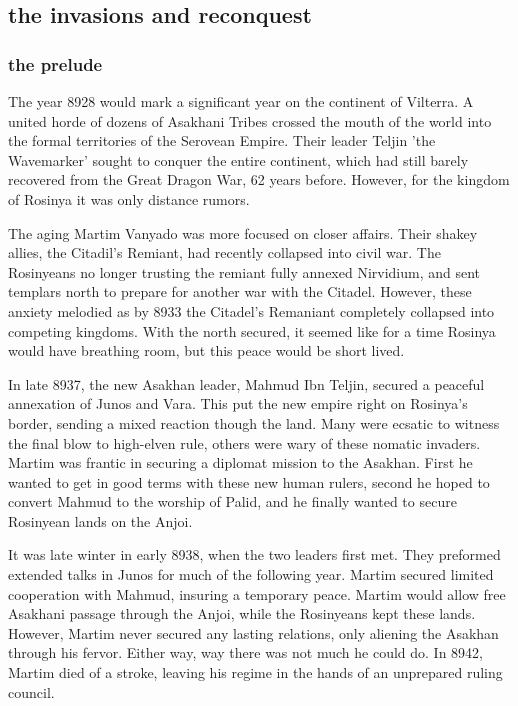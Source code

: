 \documentclass[../main.tex]{subfiles}
\begin{document}


% 

\subsection{the invasions and reconquest}

\subsubsection{the prelude}
The year 8928 would mark a significant year on the continent of Vilterra. A united horde of dozens of Asakhani Tribes crossed
the mouth of the world into the formal territories of the Serovean Empire. Their leader Teljin 'the Wavemarker' sought to 
conquer the entire continent, which had still barely recovered from the Great Dragon War, 62 years before. However, for the 
kingdom of Rosinya it was only distance rumors. 

The aging Martim Vanyado was more focused on closer affairs. Their shakey allies, the Citadil's Remiant, had recently collapsed into civil war.
The Rosinyeans no longer trusting the remiant fully annexed Nirvidium, and sent templars north to prepare for another war with the Citadel. 
However, these anxiety melodied as by 8933 the Citadel's Remaniant completely collapsed into competing kingdoms. With the north
secured, it seemed like for a time Rosinya would have breathing room, but this peace would be short lived. 

In late 8937, the new Asakhan leader, Mahmud Ibn Teljin, secured a peaceful annexation of Junos and Vara. This put the
new empire right on Rosinya's border, sending a mixed reaction though the land. Many were ecsatic to witness the final
blow to high-elven rule, others were wary of these nomatic invaders. Martim was frantic in securing a diplomat mission to
the Asakhan. First he wanted to get in good terms with these new human rulers, second he hoped to convert Mahmud to 
the worship of Palid, and he finally wanted to secure Rosinyean lands on the Anjoi. 

It was late winter in early 8938, when the two leaders first met. They preformed extended talks in Junos for
much of the following year. Martim secured limited cooperation with Mahmud, insuring a temporary peace. 
Martim would allow free Asakhani passage through the Anjoi, while the Rosinyeans kept these lands. However,
Martim never secured any lasting relations, only aliening the Asakhan through his fervor. Either way,
way there was not much he could do. In 8942, Martim died of a stroke, leaving his regime in the hands of an 
unprepared ruling council. 
\end{document}
